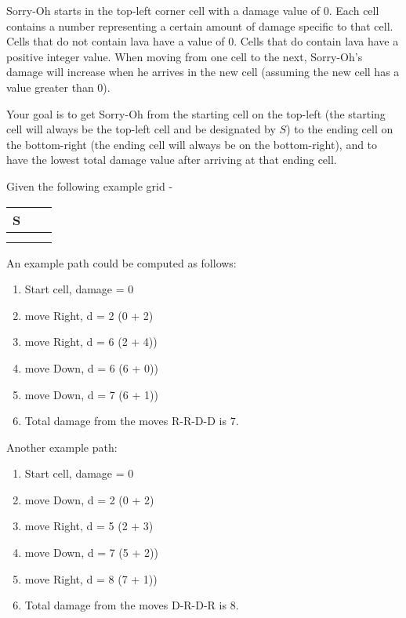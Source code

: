 \documentclass[10pt]{article}
\begin{document}
Sorry-Oh starts in the top-left corner cell with a damage value of $0$. Each cell contains a number representing a certain amount of damage specific to that cell. Cells that do not contain lava have a value of $0$. Cells that do contain lava have a positive integer value. When moving from one cell to the next, Sorry-Oh's damage will increase when he arrives in the new cell (assuming the new cell has a value greater than 0).

Your goal is to get Sorry-Oh from the starting cell on the top-left (the starting cell will always be the top-left cell and be designated by $S$) to the ending cell on the bottom-right (the ending cell will always be on the bottom-right), and to have the lowest total damage value after arriving at that ending cell.

Given the following example grid - 

\begin{tabularx}{0.4\textwidth} { 
  | >{\centering\arraybackslash}X 
  | >{\centering\arraybackslash}X 
  | >{\centering\arraybackslash}X | }
 \hline
 S & 2 & 4 \\
 \hline
 2  & 3  & 0  \\
\hline
 2  & 2  & 1  \\
\hline
\end{tabularx}

\vspace{5mm}
\noindent An example path could be computed as follows:
\begin{enumerate}
\item Start cell, damage = 0
\item move Right, d = 2 (0 + 2)
\item move Right, d = 6 (2 + 4))
\item move Down, d = 6 (6 + 0))
\item move Down, d = 7 (6 + 1))
\item Total damage from the moves R-R-D-D is 7.
\end{enumerate}

\noindent Another example path:
\begin{enumerate}
\item Start cell, damage = 0
\item move Down, d = 2 (0 + 2)
\item move Right, d = 5 (2 + 3) 
\item move Down, d = 7 (5 + 2))
\item move Right, d = 8 (7 + 1))
\item Total damage from the moves D-R-D-R is 8.
\end{enumerate}
\end{document}
